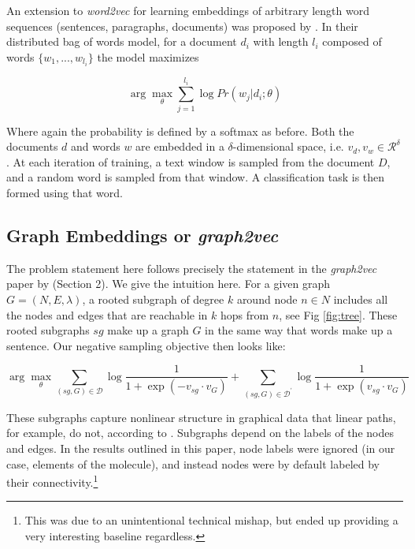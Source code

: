 An extension to \textit{word2vec} for learning embeddings of arbitrary length word sequences (sentences, paragraphs, documents) was proposed by \citet{Le2014}. In their distributed bag of words model, for a document $d_i$ with length $l_i$ composed of words $\{w_1, ..., w_{l_i}\}$ the model maximizes

\begin{equation*}
\arg\max_\theta \sum_{j=1}^{l_i} \log Pr(w_j | d_i ; \theta)
\end{equation*}

Where again the probability is defined by a softmax as before. Both the documents $d$ and words $w$ are embedded in a $\delta$-dimensional space, i.e. $v_d, v_w \in \mathcal{R}^\delta$. At each iteration of training, a text window is sampled from the document $D$, and a random word is sampled from that window. A classification task is then formed using that word.


\subsection{Graph Embeddings or \textit{graph2vec}}

The problem statement here follows precisely the statement in the \textit{graph2vec} paper by \citet{Narayanan} (Section 2). We give the intuition here. For a given graph $G = (N, E, \lambda)$, a rooted subgraph of degree $k$ around node $n \in N$ includes all the nodes and edges that are reachable in $k$ hops from $n$, see Fig \ref{fig:tree}. These rooted subgraphs $sg$ make up a graph $G$ in the same way that words make up a sentence. Our negative sampling objective then looks like:

\begin{equation*}
\arg\max_\theta
\sum_{(sg, G) \in \mathcal{D}}
    \log \dfrac{1}{1 + \exp{(-v_{sg} \cdot v_G)}}
+ \sum_{(sg, G) \in \mathcal{D^\prime}}
    \log \dfrac{1}{1 + \exp{(v_{sg} \cdot v_G)}}
\end{equation*}

These subgraphs capture nonlinear structure in graphical data that linear paths, for example, do not, according to \citet{SchweitzerPASCAL2011}. Subgraphs depend on the labels of the nodes and edges. In the results outlined in this paper, node labels were ignored (in our case, elements of the molecule), and instead nodes were by default labeled by their connectivity.\footnote{This was due to an unintentional technical mishap, but ended up providing a very interesting baseline regardless.}
